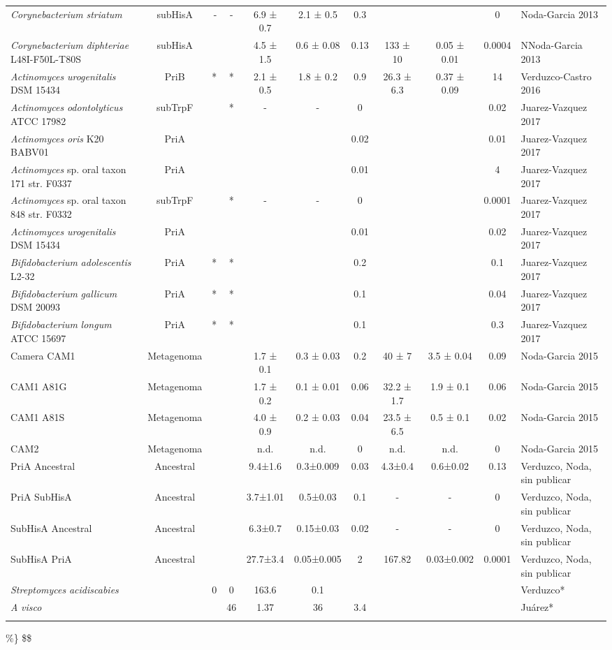 \documentclass[]{article}
\begin{document}
{\begin{tabular}{ l c r c c c c c c c l}
\textit{Corynebacterium} \textit{striatum} &subHisA&-&-&6.9 ± 0.7&2.1 ± 0.5&0.3&&&0& Noda-Garcia 2013 \\ [1ex]    
\textit{Corynebacterium} \textit{diphteriae}  L48I-F50L-T80S&subHisA&&&4.5 ± 1.5&0.6 ± 0.08&0.13&133 ± 10&0.05 ± 0.01&0.0004&NNoda-Garcia 2013\\ [1ex]    
\textit{Actinomyces} \textit{urogenitalis} DSM 15434&PriB&*&*&2.1 ± 0.5 &1.8 ± 0.2 &0.9&26.3 ± 6.3& 0.37 ± 0.09 &14&Verduzco-Castro 2016\\ [1ex]   
\textit{Actinomyces} \textit{odontolyticus}  ATCC 17982&subTrpF&&*&-&-&0&&&0.02&Juarez-Vazquez 2017\\ [1ex]    
\textit{Actinomyces} \textit{oris} K20 BABV01&PriA&&&&&0.02&&&0.01&Juarez-Vazquez 2017\\ [1ex]    
\textit{Actinomyces} sp. oral taxon 171 str. F0337&PriA&&&&&0.01&&&4&Juarez-Vazquez 2017\\ [1ex]    
\textit{Actinomyces} sp. oral taxon 848 str. F0332&subTrpF&&*&-&-&0&&&0.0001&Juarez-Vazquez 2017\\ [1ex]    
\textit{Actinomyces} \textit{urogenitalis} DSM 15434&PriA&&&&&0.01&&&0.02&Juarez-Vazquez 2017\\ [1ex]    
\textit{Bifidobacterium} \textit{adolescentis} L2-32&PriA&*&*&&&0.2&&&0.1&Juarez-Vazquez 2017\\ [1ex]    
\textit{Bifidobacterium} \textit{gallicum} DSM 20093 &PriA&*&*&&&0.1&&&0.04&Juarez-Vazquez 2017\\ [1ex]    
\textit{Bifidobacterium} \textit{longum} ATCC 15697&PriA&*&*&&&0.1&&&0.3&Juarez-Vazquez 2017\\ [1ex]    
Camera CAM1&Metagenoma&&&1.7 ± 0.1&0.3 ± 0.03&0.2&40 ± 7&3.5 ± 0.04&0.09&Noda-Garcia 2015\\ [1ex]    
CAM1 A81G&Metagenoma&&&1.7 ± 0.2&0.1 ± 0.01&0.06&32.2 ± 1.7&1.9 ± 0.1&0.06&Noda-Garcia 2015\\ [1ex]    
CAM1 A81S&Metagenoma&&&4.0 ± 0.9&0.2 ± 0.03&0.04&23.5 ± 6.5&0.5 ± 0.1&0.02&Noda-Garcia 2015\\ [1ex]    
CAM2&Metagenoma&&&n.d.&n.d.&0&n.d.&n.d.&0&Noda-Garcia 2015\\ [1ex]    
PriA Ancestral&Ancestral&&&9.4±1.6&0.3±0.009&0.03&4.3±0.4&0.6±0.02&0.13&Verduzco, Noda, sin publicar\\ [1ex]    
PriA SubHisA&Ancestral&&&3.7±1.01&0.5±0.03&0.1&-&-&0&Verduzco, Noda, sin publicar\\ [1ex]    
SubHisA Ancestral&Ancestral&&&6.3±0.7&0.15±0.03&0.02&-&-&0&Verduzco, Noda, sin publicar\\ [1ex]    
SubHisA PriA&Ancestral&&&27.7±3.4&0.05±0.005&2&167.82&0.03±0.002&0.0001&Verduzco, Noda, sin publicar\\ [1ex]    
\textit{Streptomyces} \textit{acidiscabies}&&0&0&163.6&0.1&&&&&Verduzco*\\ [1ex]  
\textit{A} \textit{visco} &&&46&1.37&36&3.4&&&&Juárez*\\ [1ex]  

\hline \\ [-1.5ex]
\hline
\end{tabular}} \%\} \$\$
\end{document}
